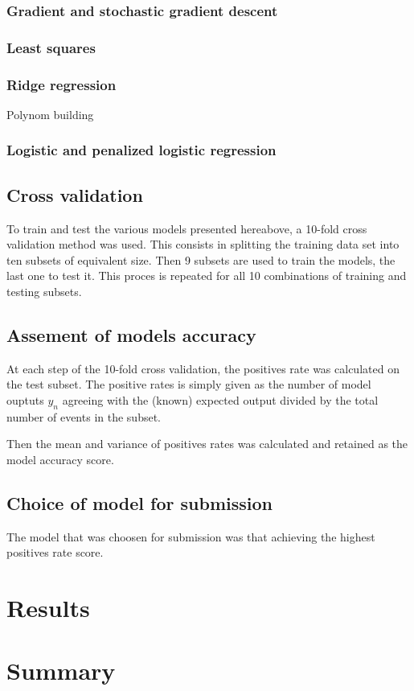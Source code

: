 \documentclass[10pt,conference,compsocconf]{IEEEtran}
\begin{document}
\subsubsection{Gradient and stochastic gradient descent}
\subsubsection{Least squares}
\subsubsection{Ridge regression}
Polynom building
\subsubsection{Logistic and penalized logistic regression}

\subsection{Cross validation}

To train and test the various models presented hereabove, a 10-fold cross validation method was used. This consists in splitting the training data set into ten subsets of equivalent size. Then 9 subsets are used to train the models, the last one to test it. This proces is repeated for all 10 combinations of training and testing subsets.

\subsection{Assement of models accuracy}

At each step of the 10-fold cross validation, the positives rate was calculated on the test subset. The positive rates is simply given as the number of model ouptuts $y_n$ agreeing with the (known) expected output divided by the total number of events in the subset.

Then the mean and variance of positives rates was calculated and retained as the model accuracy score.

\subsection{Choice of model for submission}

The model that was choosen for submission was that achieving the highest positives rate score.

\section{Results}



\section{Summary}
\end{document}
